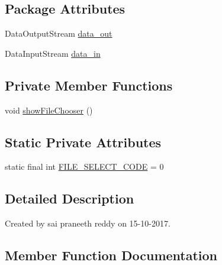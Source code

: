 \subsection*{Package Attributes}
\begin{DoxyCompactItemize}
\item 
Data\+Output\+Stream \hyperlink{classcom_1_1example_1_1saipraneethreddy_1_1pc__controller_1_1file_ab8b6604ef819fb1d12f4b89cda005679}{data\+\_\+out}
\item 
Data\+Input\+Stream \hyperlink{classcom_1_1example_1_1saipraneethreddy_1_1pc__controller_1_1file_a47d57ff1da03206753afb5add3f4ee30}{data\+\_\+in}
\end{DoxyCompactItemize}
\subsection*{Private Member Functions}
\begin{DoxyCompactItemize}
\item 
void \hyperlink{classcom_1_1example_1_1saipraneethreddy_1_1pc__controller_1_1file_aac3e1c11fdfbc1bf2e16fd583ec4588f}{show\+File\+Chooser} ()
\end{DoxyCompactItemize}
\subsection*{Static Private Attributes}
\begin{DoxyCompactItemize}
\item 
static final int \hyperlink{classcom_1_1example_1_1saipraneethreddy_1_1pc__controller_1_1file_a2692c8c00c3f94885c1ae5f3088973da}{F\+I\+L\+E\+\_\+\+S\+E\+L\+E\+C\+T\+\_\+\+C\+O\+DE} = 0
\end{DoxyCompactItemize}


\subsection{Detailed Description}
Created by sai praneeth reddy on 15-\/10-\/2017. 

\subsection{Member Function Documentation}
